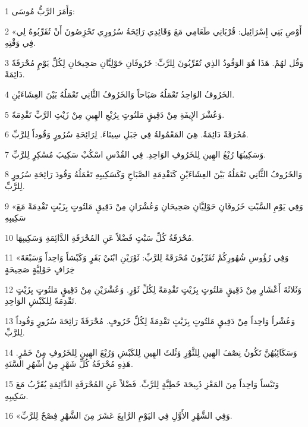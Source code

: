 \par 1 وَأَمَرَ الرَّبُّ مُوسَى:
\par 2 «أَوْصِ بَنِي إِسْرَائِيل: قُرْبَانِي طَعَامِي مَعَ وَقَائِدِي رَائِحَةُ سُرُورِي تَحْرَِصُونَ أَنْ تُقَرِّبُوهُ لِي فِي وَقْتِهِ.
\par 3 وَقُل لهُمْ. هَذَا هُوَ الوَقُودُ الذِي تُقَرِّبُونَ لِلرَّبِّ: خَرُوفَانِ حَوْلِيَّانِ صَحِيحَانِ لِكُلِّ يَوْمٍ مُحْرَقَةً دَائِمَةً.
\par 4 الخَرُوفُ الوَاحِدُ تَعْمَلُهُ صَبَاحاً وَالخَرُوفُ الثَّانِي تَعْمَلُهُ بَيْنَ العِشَاءَيْنِ.
\par 5 وَعُشْرَ الإِيفَةِ مِنْ دَقِيقٍ مَلتُوتٍ بِرُبْعِ الهِينِ مِنْ زَيْتِ الرَّبِّ تَقْدِمَةً.
\par 6 مُحْرَقَةٌ دَائِمَةٌ. هِيَ المَعْمُولةُ فِي جَبَلِ سِينَاءَ. لِرَائِحَةِ سُرُورٍ وَقُوداً لِلرَّبِّ.
\par 7 وَسَكِيبُهَا رُبْعُ الهِينِ لِلخَرُوفِ الوَاحِدِ. فِي القُدْسِ اسْكُبْ سَكِيبَ مُسْكِرٍ لِلرَّبِّ.
\par 8 وَالخَرُوفُ الثَّانِي تَعْمَلُهُ بَيْنَ العِشَاءَيْنِ كَتَقْدِمَةِ الصَّبَاحِ وَكَسَكِيبِهِ تَعْمَلُهُ وَقُودَ رَائِحَةِ سُرُورٍ لِلرَّبِّ.
\par 9 «وَفِي يَوْمِ السَّبْتِ خَرُوفَانِ حَوْلِيَّانِ صَحِيحَانِ وَعُشْرَانِ مِنْ دَقِيقٍ مَلتُوتٍ بِزَيْتٍ تَقْدِمَةً مَعَ سَكِيبِهِ
\par 10 مُحْرَقَةُ كُلِّ سَبْتٍ فَضْلاً عَنِ المُحْرَقَةِ الدَّائِمَةِ وَسَكِيبِهَا.
\par 11 «وَفِي رُؤُوسِ شُهُورِكُمْ تُقَرِّبُونَ مُحْرَقَةً لِلرَّبِّ: ثَوْرَيْنِ ابْنَيْ بَقَرٍ وَكَبْشاً وَاحِداً وَسَبْعَةَ خِرَافٍ حَوْلِيَّةٍ صَحِيحَةٍ
\par 12 وَثَلاثَةَ أَعْشَارٍ مِنْ دَقِيقٍ مَلتُوتٍ بِزَيْتٍ تَقْدِمَةً لِكُلِّ ثَوْرٍ. وَعُشْرَيْنِ مِنْ دَقِيقٍ مَلتُوتٍ بِزَيْتٍ تَقْدِمَةً لِلكَبْشِ الوَاحِدِ.
\par 13 وَعُشْراً وَاحِداً مِنْ دَقِيقٍ مَلتُوتٍ بِزَيْتٍ تَقْدِمَةً لِكُلِّ خَرُوفٍ. مُحْرَقَةً رَائِحَةَ سُرُورٍ وَقُوداً لِلرَّبِّ.
\par 14 وَسَكَائِبُهُنَّ تَكُونُ نِصْفَ الهِينِ لِلثَّوْرِ وَثُلثَ الهِينِ لِلكَبْشِ وَرُبْعَ الهِينِ لِلخَرُوفِ مِنْ خَمْرٍ. هَذِهِ مُحْرَقَةُ كُلِّ شَهْرٍ مِنْ أَشْهُرِ السَّنَةِ.
\par 15 وَتَيْساً وَاحِداً مِنَ المَعْزِ ذَبِيحَةَ خَطِيَّةٍ لِلرَّبِّ. فَضْلاً عَنِ المُحْرَقَةِ الدَّائِمَةِ يُقَرَّبُ مَعَ سَكِيبِهِ.
\par 16 «وَفِي الشَّهْرِ الأَوَّلِ فِي اليَوْمِ الرَّابِعَ عَشَرَ مِنَ الشَّهْرِ فِصْحٌ لِلرَّبِّ.

